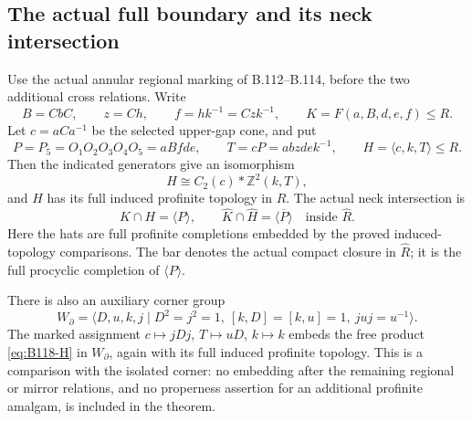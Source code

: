 \subsection*{The actual full boundary and its neck intersection}

\label{stmt:B118}
Use the actual annular regional marking of B.112--B.114, before the
two additional cross relations. Write
\[
 B=CbC,\qquad z=Ch,\qquad f=hk^{-1}=Czk^{-1},
 \qquad K=F(a,B,d,e,f)\leq R.
\]
Let $c=aCa^{-1}$ be the selected upper-gap cone, and put
\begin{equation}\label{eq:B118-marked-boundary}
 P=P_5=O_1O_2O_3O_4O_5=aBfde,\qquad
 T=cP=abzde k^{-1},\qquad H=\langle c,k,T\rangle\leq R.
\end{equation}
Then the indicated generators give an isomorphism
\begin{equation}\label{eq:B118-H}
 H\cong C_2(c)*\mathbb Z^2(k,T),
\end{equation}
and $H$ has its full induced profinite topology in $R$.
The actual neck intersection is
\begin{equation}\label{eq:B118-intersections}
 K\cap H=\langle P\rangle,\qquad
 \widehat K\cap\widehat H
       =\overline{\langle P\rangle}\quad\text{inside }\widehat R.
\end{equation}
Here the hats are full profinite completions embedded by the proved
induced-topology comparisons. The bar denotes the actual compact
closure in $\widehat R$; it is the full procyclic completion of
$\langle P\rangle$.

There is also an auxiliary corner group
\begin{equation}\label{eq:B118-corner}
 W_{\partial}=
 \langle D,u,k,j\mid D^2=j^2=1,\ [k,D]=[k,u]=1,
                         \ juj=u^{-1}\rangle.
\end{equation}
The marked assignment $c\mapsto jDj$, $T\mapsto uD$, $k\mapsto k$
embeds the free product \eqref{eq:B118-H} in $W_{\partial}$, again
with its full induced profinite topology. This is a comparison with
the isolated corner: no embedding after the remaining regional or
mirror relations, and no properness assertion for an additional
profinite amalgam, is included in the theorem.

